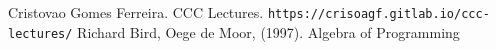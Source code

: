 \begin{thebibliography}{99}
Cristovao Gomes Ferreira. CCC Lectures.
\newline\texttt{https://crisoagf.gitlab.io/ccc-lectures/}
Richard Bird, Oege de Moor, (1997). Algebra of Programming
\end{thebibliography}
